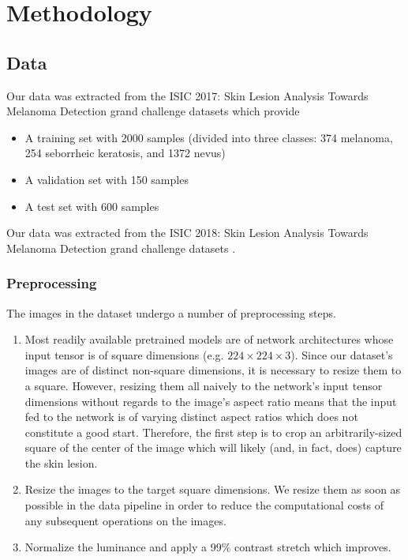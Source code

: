 \chapter{Methodology}
\label{chapter:methodology}

\section{Data}

Our data was extracted from the ISIC 2017: Skin Lesion Analysis Towards Melanoma Detection grand challenge datasets \cite{Tschandl2018}\cite{isic2017} which provide

\begin{itemize}
    \item A training set with 2000 samples (divided into three classes: 374 melanoma, 254 seborrheic keratosis, and 1372 nevus)
    \item A validation set with 150 samples
    \item A test set with 600 samples
\end{itemize}

Our data was extracted from the ISIC 2018: Skin Lesion Analysis Towards Melanoma Detection grand challenge datasets \cite{ham10000} \cite{isic2017}.

\subsection{Preprocessing}
\label{subsection:preprocessing}

The images in the dataset undergo a number of preprocessing steps.

\begin{enumerate}
    \item Most readily available pretrained models are of network architectures whose input tensor is of square dimensions (e.g. $224 \times 224 \times 3$). Since our dataset's images are of distinct non-square dimensions, it is necessary to resize them to a square. However, resizing them all naively to the network's input tensor dimensions without regards to the image's aspect ratio means that the input fed to the network is of varying distinct aspect ratios which does not constitute a good start. Therefore, the first step is to crop an arbitrarily-sized square of the center of the image which will likely (and, in fact, does) capture the skin lesion.
    \item Resize the images to the target square dimensions. We resize them as soon as possible in the data pipeline in order to reduce the computational costs of any subsequent operations on the images.
    \item Normalize the luminance and apply a 99\% contrast stretch which improves.
\end{enumerate}


